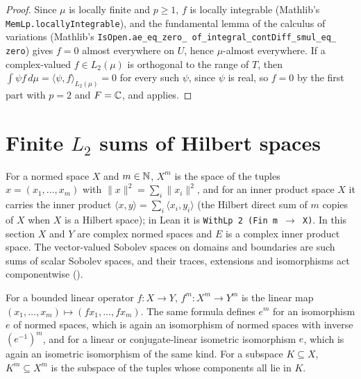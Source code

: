 \begin{proof}
\leanok
Since $\mu$ is locally finite and $p \geq 1$, $f$ is locally integrable (Mathlib's
\texttt{MemLp.\allowbreak locallyIntegrable}), and the fundamental lemma of the calculus of
variations (Mathlib's \texttt{IsOpen.\allowbreak ae\_\allowbreak eq\_\allowbreak zero\_\allowbreak
of\_\allowbreak integral\_\allowbreak contDiff\_\allowbreak smul\_\allowbreak eq\_\allowbreak
zero}) gives $f = 0$ almost everywhere on $U$, hence $\mu$-almost everywhere. If a complex-valued
$f \in L_2(\mu)$ is orthogonal to the range of $T$, then
$\int \psi f \, d\mu = \langle \psi, f \rangle_{L_2(\mu)} = 0$ for every such $\psi$, since $\psi$
is real, so $f = 0$ by the first part with $p = 2$ and $F = \mathbb{C}$, and
 applies.
\end{proof}

\section{Finite \texorpdfstring{$L_2$}{L\_2} sums of Hilbert spaces}
\label{sec:pi-lp-sums}

For a normed space $X$ and $m \in \mathbb{N}$, $X^m$ is the space of the tuples
$x = (x_1, \dots, x_m)$ with $\|x\|^2 = \sum_i \|x_i\|^2$, and for an inner product space $X$ it
carries the inner product $\langle x, y \rangle = \sum_i \langle x_i, y_i \rangle$ (the Hilbert
direct sum of $m$ copies of $X$ when $X$ is a Hilbert space); in Lean it is
\texttt{WithLp 2 (Fin m $\to$ X)}. In this section $X$ and $Y$ are complex normed spaces and $E$
is a complex inner product space. The vector-valued Sobolev spaces on domains and boundaries are
such sums of scalar Sobolev spaces, and their traces, extensions and isomorphisms act
componentwise ().

\begin{definition}
\label{def:pi-lp-maps}
\leanok
For a bounded linear operator $f \colon X \to Y$, $f^m \colon X^m \to Y^m$ is the linear map
$(x_1, \dots, x_m) \mapsto (f x_1, \dots, f x_m)$. The same formula defines $e^m$ for an
isomorphism $e$ of normed spaces, which is again an isomorphism of normed spaces with inverse
$(e^{-1})^m$, and for a linear or conjugate-linear isometric isomorphism $e$, which is again an
isometric isomorphism of the same kind. For a subspace $K \subseteq X$, $K^m \subseteq X^m$ is the
subspace of the tuples whose components all lie in $K$.
\end{definition}

